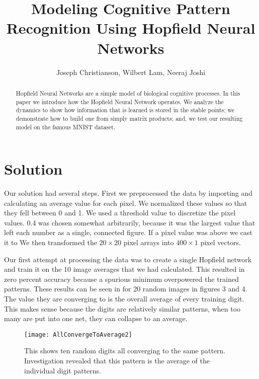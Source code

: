 \documentclass[]{article}
\title{Modeling Cognitive Pattern Recognition Using Hopfield Neural Networks}
\author{Joseph Christianson, Wilbert Lam, Neeraj Joshi}
\theoremstyle{plain}
\theoremstyle{definition}
\begin{document}
\maketitle

\begin{abstract}
Hopfield Neural Networks are a simple model of biological cognitive processes. In this paper we introduce how the Hopfield Neural Network operates. We analyze the dynamics to show how information that is learned is stored in the stable points; we demonstrate how to build one from simply matrix products; and, we test our resulting model on the famous MNIST dataset. 
\end{abstract}

\newpage

\section{Solution}

\quad Our solution had several steps. First we preprocessed the data by importing and calculating an average value for each pixel. We normalized these values so that they fell between 0 and 1. We used a threshold value to discretize the pixel values. 0.4 was chosen somewhat arbitrarily, because it was the largest value that left each number as a single, connected figure. If a pixel value was above we cast it to We then transformed the $ 20\times20 $ pixel arrays into $ 400\times 1 $ pixel vectors. 



Our first attempt at processing the data was to create a single Hopfield network and train it on the 10 image averages that we had calculated. This resulted in zero percent accuracy because a spurious minimum overpowered the trained patterns. These results can be seen in for 20 random images in figures 3 and 4. The value they are converging to is the overall average of every training digit. This makes sense because the digits are relatively similar patterns, when too many are put into one net, they can collapse to an average. 

\begin{figure}[h]
\centering
\texttt{[image: AllConvergeToAverage2]}
\caption{This shows ten random digits all converging to the same pattern. Investigation revealed that this pattern is the average of the individual digit patterns.}
\end{figure}
\end{document}
